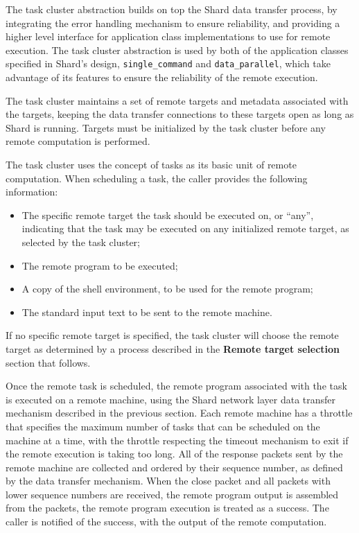 \documentclass[oneside]{report}
\begin{document}
The task cluster abstraction builds on top the Shard data transfer process, by integrating the error handling mechanism to ensure reliability, and providing a higher level interface for application class implementations to use for remote execution.
The task cluster abstraction is used by both of the application classes specified in Shard's design, \texttt{single\_command} and \texttt{data\_parallel}, which take advantage of its features to ensure the reliability of the remote execution.

The task cluster maintains a set of remote targets and metadata associated with the targets, keeping the data transfer connections to these targets open as long as Shard is running.
Targets must be initialized by the task cluster before any remote computation is performed.

The task cluster uses the concept of tasks as its basic unit of remote computation.
When scheduling a task, the caller provides the following information:
\begin{itemize}
  \item The specific remote target the task should be executed on, or ``any'', indicating that the task may be executed on any initialized remote target, as selected by the task cluster;
  \item The remote program to be executed;
  \item A copy of the shell environment, to be used for the remote program;
  \item The standard input text to be sent to the remote machine.
\end{itemize}
If no specific remote target is specified, the task cluster will choose the remote target as determined by a process described in the \textbf{Remote target selection} section that follows.

Once the remote task is scheduled, the remote program associated with the task is executed on a remote machine, using the Shard network layer data transfer mechanism described in the previous section.
Each remote machine has a throttle that specifies the maximum number of tasks that can be scheduled on the machine at a time, with the throttle respecting the timeout mechanism to exit if the remote execution is taking too long.
All of the response packets sent by the remote machine are collected and ordered by their sequence number, as defined by the data transfer mechanism.
When the close packet and all packets with lower sequence numbers are received, the remote program output is assembled from the packets, the remote program execution is treated as a success.
The caller is notified of the success, with the output of the remote computation.
\end{document}
